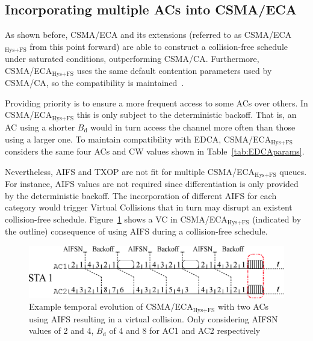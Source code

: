 
\subsection{Incorporating multiple ACs into CSMA/ECA}
As shown before, CSMA/ECA and its extensions (referred to as CSMA/ECA$_{\text{Hys+FS}}$ from this point forward) are able to construct a collision-free schedule under saturated conditions, outperforming CSMA/CA. Furthermore, CSMA/ECA$_{\text{Hys+FS}}$ uses the same default contention parameters used by CSMA/CA, so the compatibility is maintained~\cite{sanabria2014high}.

Providing priority is to ensure a more frequent access to some ACs over others. In CSMA/ECA$_{\text{Hys+FS}}$ this is only subject to the deterministic backoff. That is, an AC using a shorter $B_{\text{d}}$ would in turn access the channel more often than those using a larger one. To maintain compatibility with EDCA, CSMA/ECA$_{\text{Hys+FS}}$ considers the same four ACs and CW values shown in Table~\ref{tab:EDCAparams}. 

Nevertheless, AIFS and TXOP are not fit for multiple CSMA/ECA$_{\text{Hys+FS}}$ queues. For instance, AIFS values are not required since differentiation is only provided by the deterministic backoff. The incorporation of different AIFS for each category would trigger Virtual Collisions that in turn may disrupt an existent collision-free schedule. Figure~\ref{fig:AIFSinECA} shows a VC in CSMA/ECA$_{\text{Hys+FS}}$ (indicated by the outline) consequence of using AIFS during a collision-free schedule.

	\begin{figure}[tb]
	\centering
		\includegraphics[width=0.7\linewidth]{figures/AIFSwithECA.eps}
		\caption{Example temporal evolution of CSMA/ECA$_{\text{Hys+FS}}$ with two ACs using AIFS resulting in a virtual collision. Only considering AIFSN values of 2 and 4, $B_{\text{d}}$ of 4 and 8 for AC1 and AC2 respectively}
		\label{fig:AIFSinECA}
	\end{figure}


